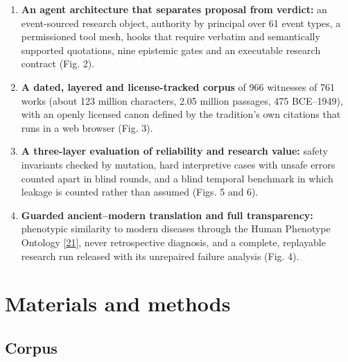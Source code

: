 \documentclass[
]{article}
\providecommand{\tightlist}{%
  \setlength{\itemsep}{0pt}\setlength{\parskip}{0pt}}
\begin{document}
\begin{enumerate}
\def\labelenumi{\arabic{enumi}.}
\tightlist
\item
  \textbf{An agent architecture that separates proposal from verdict:}
  an event-sourced research object, authority by principal over 61 event
  types, a permissioned tool mesh, hooks that require verbatim and
  semantically supported quotations, nine epistemic gates and an
  executable research contract (Fig. 2).
\item
  \textbf{A dated, layered and license-tracked corpus} of 966 witnesses
  of 761 works (about 123 million characters, 2.05 million passages, 475
  BCE--1949), with an openly licensed canon defined by the tradition's
  own citations that runs in a web browser (Fig. 3).
\item
  \textbf{A three-layer evaluation of reliability and research value:}
  safety invariants checked by mutation, hard interpretive cases with
  unsafe errors counted apart in blind rounds, and a blind temporal
  benchmark in which leakage is counted rather than assumed (Figs. 5 and
  6).
\item
  \textbf{Guarded ancient--modern translation and full transparency:}
  phenotypic similarity to modern diseases through the Human Phenotype
  Ontology {[}\protect\hyperlink{ref-kohler2021hpo}{21}{]}, never
  retrospective diagnosis, and a complete, replayable research run
  released with its unrepaired failure analysis (Fig. 4).
\end{enumerate}

\hypertarget{materials-and-methods}{%
\section{Materials and methods}\label{materials-and-methods}}

\hypertarget{corpus}{%
\subsection{Corpus}\label{corpus}}
\end{document}

